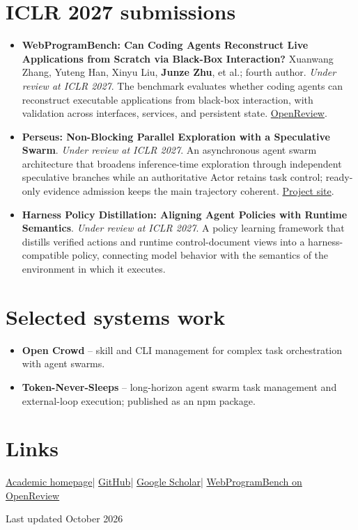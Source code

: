 \documentclass[10pt,a4paper]{article}
\begin{document}
\section{ICLR 2027 submissions}
\begin{itemize}
  \item \textbf{WebProgramBench: Can Coding Agents Reconstruct Live Applications from Scratch via Black-Box Interaction?} Xuanwang Zhang, Yuteng Han, Xinyu Liu, \textbf{Junze Zhu}, et al.; fourth author. \textit{Under review at ICLR 2027}. The benchmark evaluates whether coding agents can reconstruct executable applications from black-box interaction, with validation across interfaces, services, and persistent state. \href{https://openreview.net/forum?id=RKsIvqqtT8}{OpenReview}.
  \item \textbf{Perseus: Non-Blocking Parallel Exploration with a Speculative Swarm}. \textit{Under review at ICLR 2027}. An asynchronous agent swarm architecture that broadens inference-time exploration through independent speculative branches while an authoritative Actor retains task control; ready-only evidence admission keeps the main trajectory coherent. \href{https://huicir.github.io/Perseus/}{Project site}.
  \item \textbf{Harness Policy Distillation: Aligning Agent Policies with Runtime Semantics}. \textit{Under review at ICLR 2027}. A policy learning framework that distills verified actions and runtime control-document views into a harness-compatible policy, connecting model behavior with the semantics of the environment in which it executes.
\end{itemize}

\section{Selected systems work}
\begin{itemize}
  \item \textbf{Open Crowd} -- skill and CLI management for complex task orchestration with agent swarms.
  \item \textbf{Token-Never-Sleeps} -- long-horizon agent swarm task management and external-loop execution; published as an npm package.
\end{itemize}

\section{Links}
\small
\href{https://huicir.github.io/}{Academic homepage}\quad|\quad
\href{https://github.com/HuiCir}{GitHub}\quad|\quad
\href{https://scholar.google.com/citations?user=-XbdENoAAAAJ\&hl=en}{Google Scholar}\quad|\quad
\href{https://openreview.net/forum?id=RKsIvqqtT8}{WebProgramBench on OpenReview}

\vfill
\begin{center}\scriptsize\color{muted}Last updated October 2026\end{center}
\end{document}
